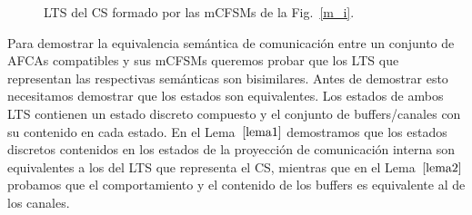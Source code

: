 \begin{figure}[H]
\begin{center}
\end{center}
\caption{LTS del CS formado por las mCFSMs de la Fig.~\ref{m_i}.}
\label{ex:CS}
\end{figure}

Para demostrar la equivalencia semántica de comunicación entre un conjunto de AFCAs compatibles y sus mCFSMs queremos probar que los LTS que representan las respectivas semánticas son bisimilares. Antes de demostrar esto necesitamos demostrar que los estados son equivalentes. Los estados de ambos LTS contienen un estado discreto compuesto y el conjunto de buffers/canales con su contenido en cada estado. En el Lema~$\ref{lema1}$ demostramos que los estados discretos contenidos en los estados de la proyección de comunicación interna son equivalentes a los del LTS que representa el CS, mientras que en el Lema~$\ref{lema2}$ probamos que el comportamiento y el contenido de los buffers es equivalente al de los canales. 

